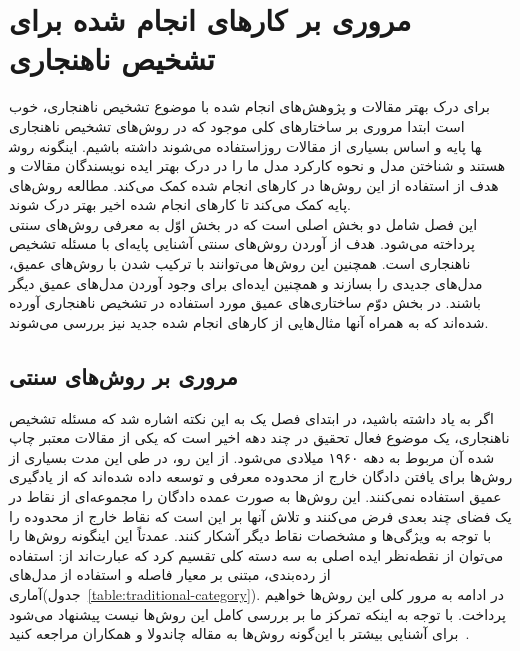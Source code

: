 \documentclass[12pt,a4paper]{report}
\begin{document}
\chapter{مروری بر کارهای انجام شده برای تشخیص ناهنجاری}

برای درک بهتر مقالات و پژوهش‌های انجام شده با موضوع تشخیص ناهنجاری، خوب است ابتدا مروری بر ساختار‌های کلی موجود که در روش‌های تشخیص ناهنجاری استفاده می‌شوند داشته باشیم. اینگونه روش‎ها پایه و اساس بسیاری از مقالات روز هستند و شناختن مدل و نحوه کارکرد مدل ما را در درک بهتر ایده نویسندگان مقالات و هدف از استفاده از این روش‌ها در کارهای انجام شده کمک می‌کند. مطالعه روش‌های پایه کمک می‌کند تا کارهای انجام شده اخیر بهتر درک شوند. \\

این فصل شامل دو بخش اصلی است که در بخش اوّل به معرفی روش‌های سنتی پرداخته می‌شود. هدف از آوردن روش‌های سنتی آشنایی پایه‌ای با مسئله تشخیص ناهنجاری است. همچنین این روش‌ها می‌توانند با ترکیب شدن با روش‌های عمیق،‌ مدل‌های جدیدی را بسازند و همچنین ایده‌ای برای وجود آوردن مدل‌های عمیق دیگر باشند. در بخش دوّم ساختاری‌های عمیق مورد استفاده در تشخیص ناهنجاری آورده شده‌اند که به همراه آنها مثال‌هایی از کار‌های انجام شده جدید نیز بررسی می‌شوند.
\section{مروری بر روش‌های سنتی}
	اگر به‌ یاد داشته باشید، در ابتدای فصل یک به این نکته اشاره شد که مسئله تشخیص ناهنجاری، یک موضوع فعال تحقیق در چند دهه اخیر است که یکی از مقالات معتبر چاپ شده آن مربوط به دهه ۱۹۶۰ میلادی می‌شود. از این رو، در طی این مدت بسیاری از روش‌ها برای یافتن دادگان خارج از محدوده معرفی و توسعه داده شده‌اند که از یادگیری عمیق استفاده نمی‌کنند. این روش‌ها به صورت عمده دادگان را مجموعه‌ای از نقاط در یک فضای چند بعدی فرض می‌کنند و تلاش آنها بر این است که نقاط خارج از محدوده را با توجه به ویژگی‌ها و مشخصات نقاط دیگر آشکار کنند. عمدتاً این اینگونه روش‌ها را می‌توان از نقطه‌نظر ایده اصلی به سه دسته کلی تقسیم کرد که عبارت‌اند از: استفاده از رده‌بندی، مبتنی بر معیار فاصله و استفاده از مدل‌های آماری(جدول~\ref{table:traditional-category}). در ادامه به مرور کلی این روش‌ها خواهیم پرداخت. با توجه به اینکه تمرکز ما بر بررسی کامل این روش‌ها نیست پیشنهاد می‌شود برای آشنایی بیشتر با این‌گونه روش‌ها به مقاله چاندولا و همکاران مراجعه کنید~\cite{V.Chandola}.
	
\end{document}

